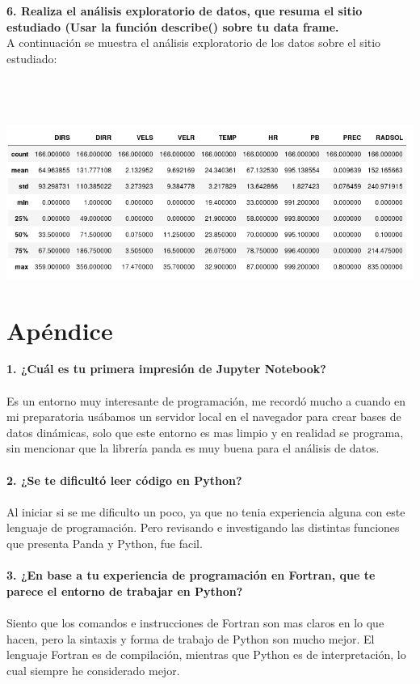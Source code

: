\documentclass[12pt]{article}
\begin{document}
\noindent\textbf {6. Realiza el análisis exploratorio de datos, que resuma el sitio estudiado (Usar la función describe() sobre tu data frame. } \\
A continuación se muestra el análisis exploratorio de los datos sobre el sitio estudiado:
\\ \\\\ \\
\begin{center}
\includegraphics[scale=0.6]{Estad1.png}
\end{center}

\section{Apéndice}
\noindent\textbf {1. ¿Cuál es tu primera impresión de Jupyter Notebook?}\\\\
Es un entorno muy interesante de programación, me recordó mucho a cuando en mi preparatoria usábamos un servidor local en el navegador para crear bases de datos dinámicas, solo que este entorno es mas limpio y en realidad se programa, sin mencionar que la librería panda es muy buena para el análisis de datos. \\ \\

\noindent\textbf {2. ¿Se te dificultó leer código en Python?}\\ \\
Al iniciar si se me dificulto un poco, ya que no tenia experiencia alguna con este lenguaje de programación. Pero revisando e investigando las distintas funciones que presenta Panda y Python, fue facil. \\ \\

\noindent\textbf {3. ¿En base a tu experiencia de programación en Fortran, que te parece el entorno de trabajar en Python?} \\ \\
Siento que los comandos e instrucciones de Fortran son mas claros en lo que hacen, pero la sintaxis y forma de trabajo de Python son mucho mejor. El lenguaje Fortran es de compilación, mientras que Python es de interpretación, lo cual siempre he considerado mejor. \\ \\
\end{document}
